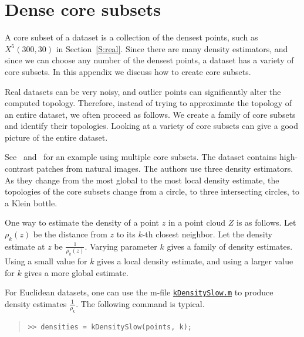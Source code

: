 \documentclass[amscd, amssymb, verbatim]{amsart}[12pt]
\theoremstyle{remark}
\theoremstyle{remark}
\theoremstyle{remark}
\begin{document}
\appendix
\appendixpage
\addappheadtotoc




\section{Dense core subsets}\label{A:core}

A core subset of a dataset is a collection of the densest points, such as $X^5(300,30)$ in Section~\ref{S:real}. Since there are many density estimators, and since we can choose any number of the densest points, a dataset has a variety of core subsets. In this appendix we discuss how to create core subsets. 

Real datasets can be very noisy, and outlier points can significantly alter the computed topology. Therefore, instead of trying to approximate the topology of an entire dataset, we often proceed as follows. We create a family of core subsets and identify their topologies. Looking at a variety of core subsets can give a good picture of the entire dataset. 

See~\citet{KleinBottle} and~\citet{WitnessComplexes} for an example using multiple core subsets. The dataset contains high-contrast patches from natural images. The authors use three density estimators. As they change from the most global to the most local density estimate, the topologies of the core subsets change from a circle, to three intersecting circles, to a Klein bottle. 

One way to estimate the density of a point $z$ in a point cloud $Z$ is as follows. Let $\rho_k(z)$ be the distance from $z$ to its $k$-th closest neighbor. Let the density estimate at $z$ be $\frac{1}{\rho_k(z)}$. Varying parameter $k$ gives a family of density estimates. Using a small value for $k$ gives a local density estimate, and using a larger value for $k$ gives a more global estimate. 

For Euclidean datasets, one can use the m-file \href{https://github.com/appliedtopology/javaplex/tree/master/src/matlab/for_distribution/tutorial_examples/kDensitySlow.m}{\texttt{kDensitySlow.m}} to produce density estimates $\frac{1}{\rho_k}$. The following command is typical.

\begin{quote} \begin{verbatim}
>> densities = kDensitySlow(points, k); 
\end{verbatim} \end{quote}
\end{document}
